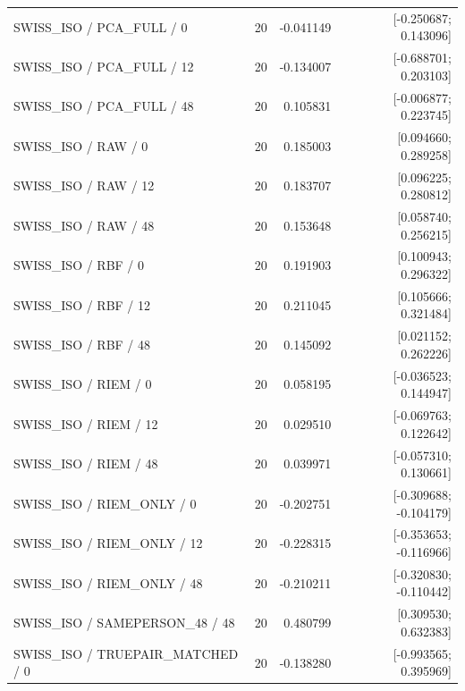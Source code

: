 \begin{longtable}{p{.56\linewidth}rrr}
SWISS\_ISO / PCA\_FULL / 0 & 20 & -0.041149 & [-0.250687; 0.143096] \\
SWISS\_ISO / PCA\_FULL / 12 & 20 & -0.134007 & [-0.688701; 0.203103] \\
SWISS\_ISO / PCA\_FULL / 48 & 20 & 0.105831 & [-0.006877; 0.223745] \\
SWISS\_ISO / RAW / 0 & 20 & 0.185003 & [0.094660; 0.289258] \\
SWISS\_ISO / RAW / 12 & 20 & 0.183707 & [0.096225; 0.280812] \\
SWISS\_ISO / RAW / 48 & 20 & 0.153648 & [0.058740; 0.256215] \\
SWISS\_ISO / RBF / 0 & 20 & 0.191903 & [0.100943; 0.296322] \\
SWISS\_ISO / RBF / 12 & 20 & 0.211045 & [0.105666; 0.321484] \\
SWISS\_ISO / RBF / 48 & 20 & 0.145092 & [0.021152; 0.262226] \\
SWISS\_ISO / RIEM / 0 & 20 & 0.058195 & [-0.036523; 0.144947] \\
SWISS\_ISO / RIEM / 12 & 20 & 0.029510 & [-0.069763; 0.122642] \\
SWISS\_ISO / RIEM / 48 & 20 & 0.039971 & [-0.057310; 0.130661] \\
SWISS\_ISO / RIEM\_ONLY / 0 & 20 & -0.202751 & [-0.309688; -0.104179] \\
SWISS\_ISO / RIEM\_ONLY / 12 & 20 & -0.228315 & [-0.353653; -0.116966] \\
SWISS\_ISO / RIEM\_ONLY / 48 & 20 & -0.210211 & [-0.320830; -0.110442] \\
SWISS\_ISO / SAMEPERSON\_48 / 48 & 20 & 0.480799 & [0.309530; 0.632383] \\
SWISS\_ISO / TRUEPAIR\_MATCHED / 0 & 20 & -0.138280 & [-0.993565; 0.395969] \\
\bottomrule\end{longtable}
